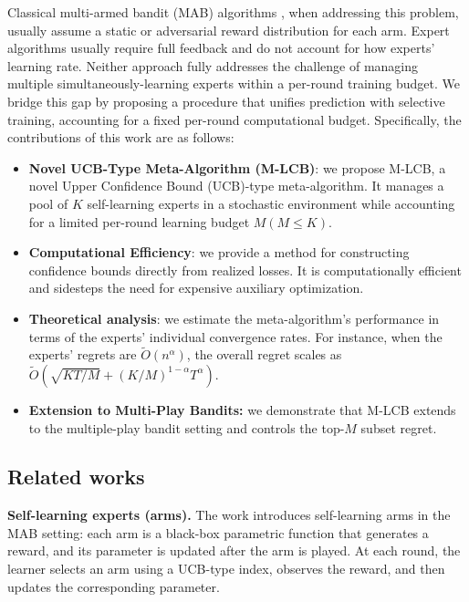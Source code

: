 \documentclass[a4paper,14pt]{extarticle}
\theoremstyle{plain}
\begin{document}
Classical multi-armed bandit (MAB) algorithms \cite{auer2002finite,bubeck2012regret,lattimore2020bandit}, when addressing this problem, usually assume a static or adversarial reward distribution for each arm. Expert algorithms \cite{cesa2006prediction,hazan2016introduction} usually require full feedback  and do not account for how experts' learning rate. Neither approach fully addresses the challenge of managing multiple simultaneously-learning experts within a per-round training budget. We bridge this gap by proposing a procedure that
unifies prediction with selective training, accounting for a fixed per-round computational budget. Specifically, the contributions of this work are as follows:
\begin{itemize}
    \item \textbf{Novel UCB-Type Meta-Algorithm (M-LCB)}: we propose M-LCB, a novel Upper Confidence Bound (UCB)-type meta-algorithm. It manages a pool of $K$ self-learning experts in a stochastic environment while accounting for a limited per-round learning budget $M (M\le K)$.
    \item \textbf{Computational Efficiency}: we provide a method for constructing confidence bounds directly from realized losses. It is computationally efficient and sidesteps the need for expensive auxiliary optimization.
    \item \textbf{Theoretical analysis}: we estimate the meta-algorithm's performance in terms of the experts' individual convergence rates. For instance, when the experts' regrets are $\tilde O(n^\alpha)$, the overall regret scales as $\tilde O(\sqrt{KT/M} + (K/M)^{1-\alpha}T^\alpha)$.
    \item \textbf{Extension to Multi-Play Bandits:} we demonstrate that M-LCB extends to the multiple-play bandit setting and controls the top-$M$ subset regret.
\end{itemize}


\subsection{Related works}


\textbf{Self-learning experts (arms).}
The work \cite{dorn2025functional} introduces self-learning arms in the MAB setting: each arm is a black-box parametric function that generates a reward, and its parameter is updated after the arm is played. At each round, the learner selects an arm using a UCB-type index, observes the reward, and then updates the corresponding parameter.
\end{document}
